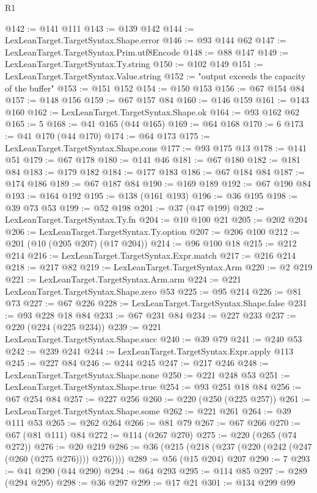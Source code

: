 \begin{lexlean}{R1}
\begin{coremodule}
@142 := @141 @111
@143 := @139 @142
@144 := LexLeanTarget.TargetSyntax.Shape.error
@146 := @93 @144 @62
@147 := LexLeanTarget.TargetSyntax.Prim.utf8Encode
@148 := @88 @147
@149 := LexLeanTarget.TargetSyntax.Ty.string
@150 := @102 @149
@151 := LexLeanTarget.TargetSyntax.Value.string
@152 := "output exceeds the capacity of the buffer"
@153 := @151 @152
@154 := @150 @153
@156 := @67 @154 @84
@157 := @148 @156
@159 := @67 @157 @84
@160 := @146 @159
@161 := @143 @160
@162 := LexLeanTarget.TargetSyntax.Shape.ok
@164 := @93 @162 @62
@165 := 5
@168 := @41 @165 (@44 @165)
@169 := @64 @168
@170 := 6
@173 := @41 @170 (@44 @170)
@174 := @64 @173
@175 := LexLeanTarget.TargetSyntax.Shape.cons
@177 := @93 @175 @13
@178 := @141 @51
@179 := @67 @178
@180 := @141 @46
@181 := @67 @180
@182 := @181 @84
@183 := @179 @182
@184 := @177 @183
@186 := @67 @184 @84
@187 := @174 @186
@189 := @67 @187 @84
@190 := @169 @189
@192 := @67 @190 @84
@193 := @164 @192
@195 := @138 (@161 @193)
@196 := @36 @195
@198 := @39 @73 @53
@199 := @52 @198
@201 := @37 (@47 @199)
@202 := LexLeanTarget.TargetSyntax.Ty.fn
@204 := @10 @100 @21
@205 := @202 @204
@206 := LexLeanTarget.TargetSyntax.Ty.option
@207 := @206 @100
@212 := @201 (@10 (@205 @207) (@17 @204))
@214 := @96 @100 @18
@215 := @212 @214
@216 := LexLeanTarget.TargetSyntax.Expr.match
@217 := @216 @214
@218 := @217 @82
@219 := LexLeanTarget.TargetSyntax.Arm
@220 := @2 @219
@221 := LexLeanTarget.TargetSyntax.Arm.arm
@224 := @221 LexLeanTarget.TargetSyntax.Shape.zero @53
@225 := @95 @214
@226 := @81 @73
@227 := @67 @226
@228 := LexLeanTarget.TargetSyntax.Shape.false
@231 := @93 @228 @18 @84
@233 := @67 @231 @84
@234 := @227 @233
@237 := @220 (@224 (@225 @234))
@239 := @221 LexLeanTarget.TargetSyntax.Shape.succ
@240 := @39 @79
@241 := @240 @53
@242 := @239 @241
@244 := LexLeanTarget.TargetSyntax.Expr.apply @113
@245 := @227 @84
@246 := @244 @245
@247 := @217 @246
@248 := LexLeanTarget.TargetSyntax.Shape.none
@250 := @221 @248 @53
@251 := LexLeanTarget.TargetSyntax.Shape.true
@254 := @93 @251 @18 @84
@256 := @67 @254 @84
@257 := @227 @256
@260 := @220 (@250 (@225 @257))
@261 := LexLeanTarget.TargetSyntax.Shape.some
@262 := @221 @261
@264 := @39 @111 @53
@265 := @262 @264
@266 := @81 @79
@267 := @67 @266
@270 := @67 (@81 @111) @84
@272 := @114 (@267 @270)
@275 := @220 (@265 (@74 @272))
@276 := @20 @219
@286 := @36 (@215 (@218 (@237 (@220 (@242 (@247 (@260 (@275 @276)))) @276))))
@289 := @56 (@15 @204) @207
@290 := 7
@293 := @41 @290 (@44 @290)
@294 := @64 @293
@295 := @114 @85
@297 := @289 (@294 @295)
@298 := @36 @297
@299 := @17 @21
@301 := @134 @299 @99

\end{coremodule}
\end{lexlean}

